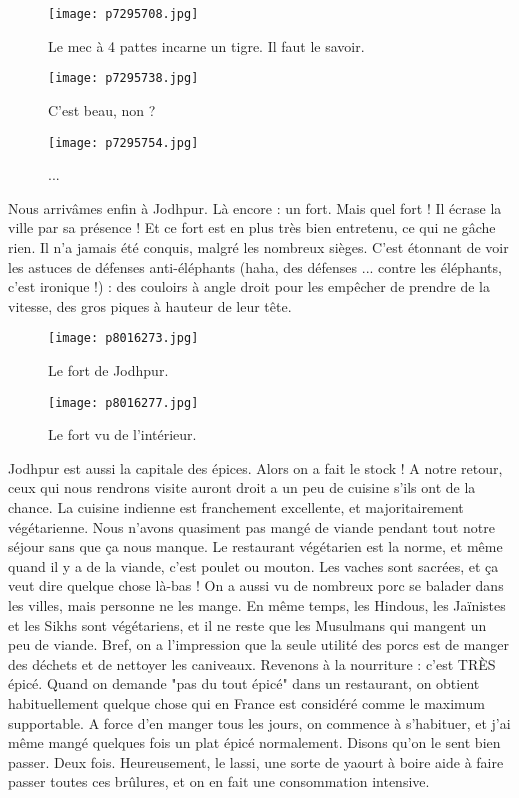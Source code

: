 \documentclass{book}
\begin{document}
\begin{figure}[h]
\centering
\texttt{[image: p7295708.jpg]}
\caption*{Le mec à 4 pattes incarne un tigre. Il faut le savoir.}
\end{figure}


\begin{figure}[h]
\centering
\texttt{[image: p7295738.jpg]}
\caption*{C'est beau, non ?}
\end{figure}


\begin{figure}[h]
\centering
\texttt{[image: p7295754.jpg]}
\caption*{...}
\end{figure}

Nous arrivâmes enfin à Jodhpur. Là encore : un fort. Mais quel fort ! Il écrase la ville par sa présence ! Et ce fort est en plus très bien entretenu, ce qui ne gâche rien. Il n'a jamais été conquis, malgré les nombreux sièges. C'est étonnant de voir les astuces de défenses anti-éléphants (haha, des défenses ... contre les éléphants, c'est ironique !) : des couloirs à angle droit pour les empêcher de prendre de la vitesse, des gros piques à hauteur de leur tête.


\begin{figure}[h]
\centering
\texttt{[image: p8016273.jpg]}
\caption*{Le fort de Jodhpur.}
\end{figure}


\begin{figure}[h]
\centering
\texttt{[image: p8016277.jpg]}
\caption*{Le fort vu de l'intérieur.}
\end{figure}

Jodhpur est aussi la capitale des épices. Alors on a fait le stock ! A notre retour, ceux qui nous rendrons visite auront droit a un peu de cuisine s'ils ont de la chance. La cuisine indienne est franchement excellente, et majoritairement végétarienne. Nous n'avons quasiment pas mangé de viande pendant tout notre séjour sans que ça nous manque. Le restaurant végétarien est la norme, et même quand il y a de la viande, c'est poulet ou mouton. Les vaches sont sacrées, et ça veut dire quelque chose là-bas ! On a aussi vu de nombreux porc se balader dans les villes, mais personne ne les mange. En même temps, les Hindous, les Jaïnistes et les Sikhs sont végétariens, et il ne reste que les Musulmans qui mangent un peu de viande. Bref, on a l'impression que la seule utilité des porcs est de manger des déchets et de nettoyer les caniveaux. Revenons à la nourriture : c'est TRÈS épicé. Quand on demande "pas du tout épicé" dans un restaurant, on obtient habituellement quelque chose qui en France est considéré comme le maximum supportable. A force d'en manger tous les jours, on commence à s'habituer, et j'ai même mangé quelques fois un plat épicé normalement. Disons qu'on le sent bien passer. Deux fois. Heureusement, le lassi, une sorte de yaourt à boire aide à faire passer toutes ces brûlures, et on en fait une consommation intensive.
\end{document}
